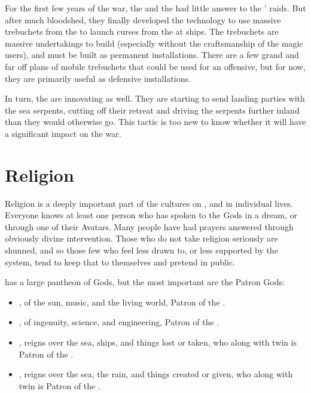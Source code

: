 \documentclass[blue]{GL2020}
\begin{document}
For the first few years of the war, the \pFarm{} and the \pTech{} had little answer to the \pShippies{}’ raids. But after much bloodshed, they finally developed the technology to use massive trebuchets from the \pTech{} to launch curses from the \pFarm{} at \pShippie{} ships. The trebuchets are massive undertakings to build (especially without the craftsmanship of the \pShip{} magic users), and must be built as permanent installations. There are a few grand and far off plans of mobile trebuchets that could be used for an offensive, but for now, they are primarily useful as defensive installations.

In turn, the \pShip{} are innovating as well. They are starting to send landing parties with the sea serpents, cutting off their retreat and driving the serpents further inland than they would otherwise go. This tactic is too new to know whether it will have a significant impact on the war.

\section*{Religion}
Religion is a deeply important part of the cultures on \pEarth{}, and in individual lives. Everyone knows at least one person who has spoken to the Gods in a dream, or through one of their Avatars. Many people have had prayers answered through obviously divine intervention. Those who do not take religion seriously are shunned, and so those few who feel less drawn to, or less supported by the system, tend to keep that to themselves and pretend in public.

\pEarth{} has a large pantheon of Gods, but the most important are the Patron Gods:
\begin{itemize}
    \item \cFarmGod{}, \cFarmGod{\God} of the sun, music, and the living world, Patron of the \pFarm{}.
    \item \cTechGod{}, \cTechGod{\God} of ingenuity, science, and engineering, Patron of the \pTech{}.
    \item \cEbbFull{\full}, reigns over the sea, ships, and things lost or taken, who along with \cEbb{\their} twin \cFlowFull{} is Patron of the \pShip{}.
    \item \cFlowFull{\full}, reigns over the sea, the rain, and things created or given, who along with \cFlow{\their} twin \cEbbFull{} is Patron of the \pShip{}.
\end{itemize}
\end{document}
